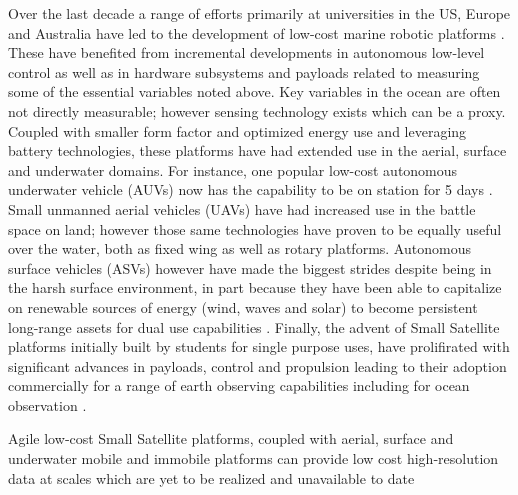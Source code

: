 Over the last decade a range of efforts primarily at universities in
the US, Europe and Australia have led to the development of low-cost
marine robotic platforms \cite{}. These have benefited from
incremental developments in autonomous low-level control \cite{} as
well as in hardware subsystems and payloads related to measuring some
of the essential variables noted above. Key variables in the ocean are
often not directly measurable; however sensing technology exists which
can be a proxy. Coupled with smaller form factor and optimized energy
use and leveraging battery technologies, these platforms have had
extended use in the aerial, surface and underwater domains. For
instance, one popular low-cost autonomous underwater vehicle (AUVs)
now has the capability to be on station for 5 days \cite{}. Small
unmanned aerial vehicles (UAVs) have had increased use in the battle
space on land; however those same technologies have proven to be
equally useful over the water, both as fixed wing as well as rotary
platforms. Autonomous surface vehicles (ASVs) however have made the
biggest strides despite being in the harsh surface environment, in
part because they have been able to capitalize on renewable sources of
energy (wind, waves and solar) to become persistent long-range assets
for dual use capabilities \cite{}. Finally, the advent of Small
Satellite platforms initially built by students for single purpose
uses, have prolifirated with significant advances in payloads, control
and propulsion leading to their adoption commercially for a range of
earth observing capabilities including for ocean observation \cite{}.



Agile low‐cost Small Satellite platforms, coupled with aerial, surface
and underwater mobile and immobile platforms can provide low cost
high‐resolution data at scales which are yet to be realized and
unavailable to date
